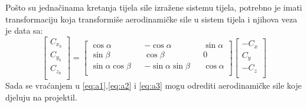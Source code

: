 Pošto su jednačinama kretanja tijela sile izražene sistemu tijela, potrebno
je imati transformaciju koja transformiše aerodinamičke sile u sistem tijela i njihova veza je data sa:
\begin{equation}
    \begin{bmatrix}
        C_{x_b}\\
        C_{y_b}\\
        C_{z_b}\\
    \end{bmatrix}=\begin{bmatrix}
        \cos\alpha && -\cos\alpha && \sin\alpha\\
        \sin\beta &&\cos\beta && 0\\
        \sin\alpha\cos\beta && -\sin\alpha\sin\beta && \cos\alpha\\
    \end{bmatrix}\begin{bmatrix}
        -C_x\\
        C_y\\
        -C_z\\
    \end{bmatrix}
\end{equation} Sada se vraćanjem u \ref{eq:a1},\ref{eq:a2} i \ref{eq:a3} mogu odrediti 
aerodinamičke sile koje djeluju na projektil. 
